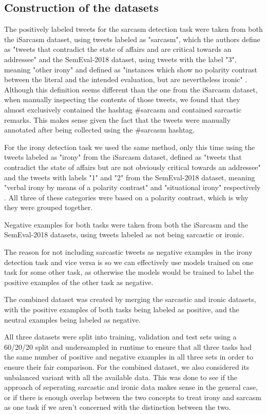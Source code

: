 \documentclass[10pt, a4paper]{article}
\begin{document}
\subsection{Construction of the datasets}\label{sec:dataset_construction}

The positively labeled tweets for the sarcasm detection task were taken from both the iSarcasm dataset, using tweets labeled
as "sarcasm", which the authors define as "tweets that contradict the state of affairs and are critical towards an addressee"
\citep{iSarcasm} and the SemEval-2018 dataset, using tweets with the label "3", meaning "other irony" and defined as "instances
which show no polarity contrast between the literal and the intended evaluation, but are nevertheless ironic" 
\citep{semeval-2018}. Although this definition seems different than the one from the iSarcasm dataset, when manually
inspecting the contents of those tweets, we found that they almost exclusively contained the hashtag \#sarcasm and contained
sarcastic remarks. This makes sense given the fact that the tweets were manually annotated after being collected using the
\#sarcasm hashtag.

For the irony detection task we used the same method, only this time using the tweets labeled as "irony" from the iSarcasm
dataset, defined as "tweets that contradict the state of affairs but are not obviously critical towards an
addressee" \citep{iSarcasm} and the tweets with labels "1" and "2" from the SemEval-2018 dataset, meaning "verbal irony by means 
of a polarity contrast" and "situational irony" respectively \citep{semeval-2018}. All three of these categories were based
on a polarity contrast, which is why they were grouped together.

Negative examples for both tasks were taken from both the iSarcasm and the SemEval-2018 datasets, using tweets labeled as
not being sarcastic or ironic.

The reason for not including sarcastic tweets as negative examples in the irony detection task and vice versa is so we
can effectively use models trained on one task for some other task, as otherwise the models would be trained
to label the positive examples of the other task as negative.

The combined dataset was created by merging the sarcastic and ironic datasets, with the positive examples of both tasks
being labeled as positive, and the neutral examples being labeled as negative.

All three datasets were split into training, validation and test sets using a 60/20/20 split and undersampled in runtime to ensure that all three
tasks had the same number of positive and negative examples in all three sets in order to ensure their fair comparison. For
the combined dataset, we also considered its unbalanced variant with all the available data. This was done to see if the 
approach of seperating sarcastic and ironic data makes sense in the general case, or if there is enough overlap between 
the two concepts to treat irony and sarcasm as one task if we aren't concerned with the distinction between the two.
\end{document}
